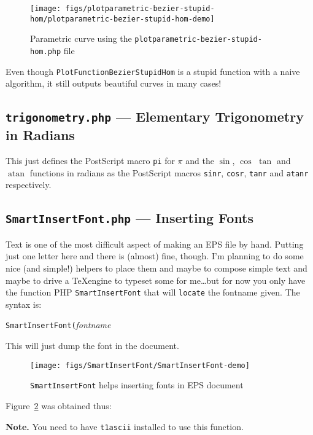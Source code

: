 \documentclass[10pt,a4paper]{scrartcl}
\newcommand\PS{PostScript}
\newenvironment{note}{\par\leavevmode\medskip\textbf{Note.} }{\par\leavevmode\medskip}
\begin{document}
\begin{figure}[ht!]%
\centering
\texttt{[image: figs/plotparametric-bezier-stupid-hom/plotparametric-bezier-stupid-hom-demo]}%
\caption{Parametric curve using the \texttt{plotparametric-bezier-stupid-hom.php} file}%
\label{fig:plotparametric-bezier-stupid-hom-demo}%
\end{figure}

Even though \texttt{PlotFunctionBezierStupidHom} is a stupid function with a
naive algorithm, it still outputs beautiful curves in many cases!

\subsection{\texttt{trigonometry.php} --- Elementary Trigonometry in Radians}
\label{ssec:trigonometry.php}
This just defines the \PS{} macro \verb=pi= for $\pi$ and the $\sin$, $\cos$
$\tan$ and $\operatorname{atan}$ functions in radians as the \PS{} macros \verb=sinr=,
\verb=cosr=, \verb=tanr= and \verb=atanr= respectively.

\subsection{\texttt{SmartInsertFont.php} --- Inserting Fonts}
\label{ssec:SmartInsertFont.php}
Text is one of the most difficult aspect of making an EPS file by hand. Putting
just one letter here and there is (almost) fine, though. I'm planning to do
some nice (and simple!) helpers to place them and maybe to compose simple text
and maybe to drive a \TeX engine to typeset some for me\ldots but for now you
only have the function PHP \texttt{SmartInsertFont} that will \texttt{locate}
the fontname given. The syntax is:
\begin{center}
\texttt{SmartInsertFont\quad(}\quad\textit{fontname}\quad{)}
\end{center}
This will just dump the font in the document.
\begin{figure}[ht!]%
\centering
\texttt{[image: figs/SmartInsertFont/SmartInsertFont-demo]}%
\caption{\texttt{SmartInsertFont} helps inserting fonts in EPS document}%
\label{fig:SmartInsertFont-demo.php}%
\end{figure}

Figure~\ref{fig:SmartInsertFont-demo.php} was obtained thus:


\begin{note}
You need to have \texttt{t1ascii} installed to use this function.
\end{note}
\end{document}
